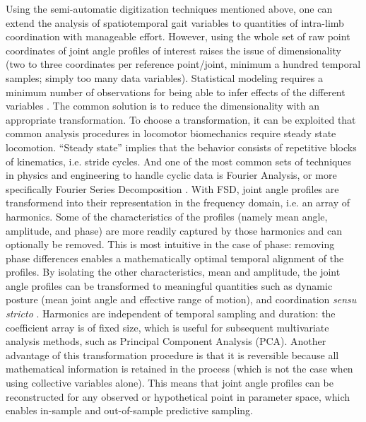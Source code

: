 Using the semi-automatic digitization techniques mentioned above, one can extend the analysis of spatiotemporal gait variables to quantities of intra-limb coordination with manageable effort.
However, using the whole set of raw point coordinates of joint angle profiles of interest raises the issue of dimensionality (two to three coordinates per reference point/joint, minimum a hundred temporal samples; simply too many data variables).
Statistical modeling requires a minimum number of observations for being able to infer effects of the different variables \citep{Frick1996,Maxwell2017,Riley2020,Austin2015}.
The common solution is to reduce the dimensionality with an appropriate transformation.
To choose a transformation, it can be exploited that common analysis procedures in locomotor biomechanics require steady state locomotion.
``Steady state'' implies that the behavior consists of repetitive blocks of kinematics, i.e. stride cycles.
And one of the most common sets of techniques in physics and engineering to handle cyclic data is Fourier Analysis, or more specifically Fourier Series Decomposition \citep[FSD;][]{Mielke2019,Webb2007,Fourier1822,Bracewell2000,Gray1995,Pike2002}.
With FSD, joint angle profiles are transformend into their representation in the frequency domain, i.e. an array of harmonics.
Some of the characteristics of the profiles (namely mean angle, amplitude, and phase) are more readily captured by those harmonics and can optionally be removed.
This is most intuitive in the case of phase: removing phase differences enables a mathematically optimal temporal alignment of the profiles.
By isolating the other characteristics, mean and amplitude, the joint angle profiles can be transformed to meaningful quantities such as dynamic posture (mean joint angle and effective range of motion), and coordination \emph{sensu stricto} \citep[relative phase/joint timing and residual kinematics, \textit{cf.}][, and Ch. \ref{cpt:fourier_review}]{Mielke2019}.
Harmonics are independent of temporal sampling and duration: the coefficient array is of fixed size, which is useful for subsequent multivariate analysis methods, such as Principal Component Analysis (PCA).
Another advantage of this transformation procedure is that it is reversible because all mathematical information is retained in the process (which is not the case when using collective variables alone).
This means that joint angle profiles can be reconstructed for any observed or hypothetical point in parameter space, which enables in-sample and out-of-sample predictive sampling.

